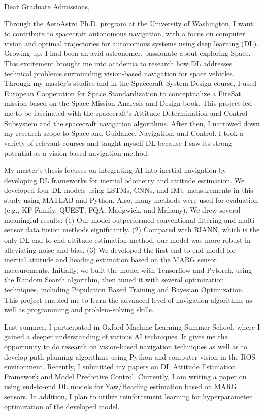 \documentclass[a4,25pt]{article}
\begin{document}
\begin{large} 
\vspace{-0.3cm}Dear Graduate Admissions, \par
\vspace{-0.35cm} \quad 
Through the AeroAstro Ph.D. program at the University of Washington, I want to contribute to spacecraft autonomous navigation, with a focus on computer vision and optimal trajectories for autonomous systems using deep learning (DL). Growing up, I had been an avid astronomer, passionate about exploring Space. This excitement brought me into academia to research how DL addresses technical problems surrounding vision-based navigation for space vehicles. Through my master's studies and in the Spacecraft System Design course, I used European Cooperation for Space Standardization to conceptualize a FireSat mission based on the Space Mission Analysis and Design book. This project led me to be fascinated with the spacecraft’s Attitude Determination and Control Subsystem and the spacecraft navigation algorithms. After then, I narrowed down my research scope to Space and Guidance, Navigation, and Control. I took a variety of relevant courses and taught myself DL because I saw its strong potential as a vision-based navigation method. \par
\vspace{-0.35cm} \quad  My master’s thesis focuses on integrating AI into inertial navigation by developing DL frameworks for inertial odometry and attitude estimation. We developed four DL models using LSTMs, CNNs, and IMU measurements in this study using MATLAB and Python. Also, many methods were used for evaluation (e.g., KF Family, QUEST, FQA, Madgwick, and Mahony). We drew several meaningful results: (1) Our model outperformed conventional filtering and multi-sensor data fusion methods significantly. (2) Compared with RIANN, which is the only DL end-to-end attitude estimation method, our model was more robust in alleviating noise and bias. (3) We developed the first end-to-end model for inertial attitude and heading estimation based on the MARG sensor measurements. Initially, we built the model with Tensorflow and Pytorch, using the Random Search algorithm, then tuned it with several optimization techniques, including Population Based Training and Bayesian Optimization. This project enabled me to learn the advanced level of navigation algorithms as well as programming and problem-solving skills.\par
\vspace{-0.35cm} \quad  Last summer, I participated in Oxford Machine Learning Summer School, where I gained a deeper understanding of various AI techniques. It gives me the opportunity to do research on vision-based navigation techniques as well as to develop path-planning algorithms using Python and computer vision in the ROS environment. Recently, I submitted my papers on DL Attitude Estimation Framework and Model Predictive Control. Currently, I am writing a paper on using end-to-end DL models for Yaw/Heading estimation based on MARG sensors. In addition, I plan to utilize reinforcement learning for hyperparameter optimization of the developed model.  \par

\end{large}
\end{document}
